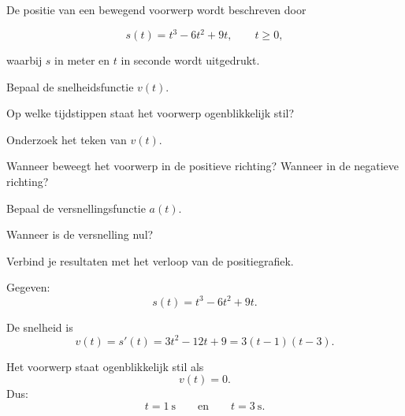 \documentclass{ximera}
\begin{document}





\begin{oefening}{\oefU\ESS}

De positie van een bewegend voorwerp wordt beschreven door

\[
s(t)=t^3-6t^2+9t,
\qquad t\geq 0,
\]

waarbij $s$ in meter en $t$ in seconde wordt uitgedrukt.

\begin{question}
Bepaal de snelheidsfunctie $v(t)$.
\end{question}

\begin{question}
Op welke tijdstippen staat het voorwerp ogenblikkelijk stil?
\end{question}

\begin{question}
Onderzoek het teken van $v(t)$.
\end{question}

\begin{question}
Wanneer beweegt het voorwerp in de positieve richting?
Wanneer in de negatieve richting?
\end{question}

\begin{question}
Bepaal de versnellingsfunctie $a(t)$.
\end{question}

\begin{question}
Wanneer is de versnelling nul?
\end{question}

\begin{question}
Verbind je resultaten met het verloop van de positiegrafiek.
\end{question}

\begin{oplossing}

Gegeven:
\[
s(t)=t^3-6t^2+9t.
\]

De snelheid is
\[
v(t)=s'(t)=3t^2-12t+9
=3(t-1)(t-3).
\]

Het voorwerp staat ogenblikkelijk stil als
\[
v(t)=0.
\]
Dus:
\[
\boxed{t=1\ \mathrm{s}}
\qquad\text{en}\qquad
\boxed{t=3\ \mathrm{s}}.
\]


\end{oplossing}
\end{oefening}
\end{document}
